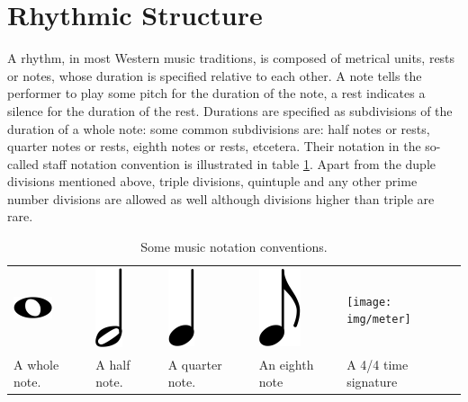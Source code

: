 \section{Rhythmic Structure}
\label{sec:structure}

A rhythm, in most Western music traditions, is composed of metrical units, rests or notes, whose duration is specified relative to each other. A note tells the performer to play some pitch for the duration of the note, a rest indicates a silence for the duration of the rest. Durations are specified as subdivisions of the duration of a whole note: some common subdivisions are: half notes or rests, quarter notes or rests, eighth notes or rests, etcetera. Their notation in the so-called staff notation convention is illustrated in table \ref{tab:notation}. Apart from the duple divisions mentioned above, triple divisions, quintuple and any other prime number divisions are allowed as well although divisions higher than triple are rare. 

\begin{table}
\caption{Some music notation conventions.}
\label{tab:notation}
\centering
\begin{tabular}{lllll}
\parbox{0.15\linewidth}{
\centering
\includegraphics[scale=0.5]{img/whole_note}
}
&
\parbox{0.15\linewidth}{
\centering
\includegraphics[scale=0.5]{img/half_note}
}
&
\parbox{0.15\linewidth}{
\centering
\includegraphics[scale=0.5]{img/quarter_note}
}
&
\parbox{0.15\linewidth}{
\centering
\includegraphics[scale=0.5]{img/eighth_note}
}
&
\parbox{0.15\linewidth}{
\centering
\texttt{[image: img/meter]}
}
\\
A whole note. & A half note. & A quarter note. & An eighth note & A 4/4 time signature\\

\end{tabular}
\end{table}

